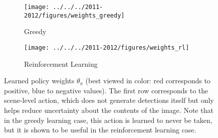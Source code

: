 \begin{figure}[h!]
\centering
\begin{subfigure}[t]{0.48\linewidth}
    \texttt{[image: ../../../2011-2012/figures/weights\_greedy]}
    \caption{Greedy}
\end{subfigure}
\begin{subfigure}[t]{0.48\linewidth}
    \texttt{[image: ../../../2011-2012/figures/weights\_rl]}
    \caption{Reinforcement Learning}
\end{subfigure}
\caption{
Learned policy weights $\theta_\pi$ (best viewed in color: red corresponds to positive, blue to negative values).
The first row corresponds to the scene-level action, which does not generate detections itself but only helps reduce uncertainty about the contents of the image.
Note that in the greedy learning case, this action is learned to never be taken, but it is shown to be useful in the reinforcement learning case.
}
\label{fig:det_weights}
\end{figure}
